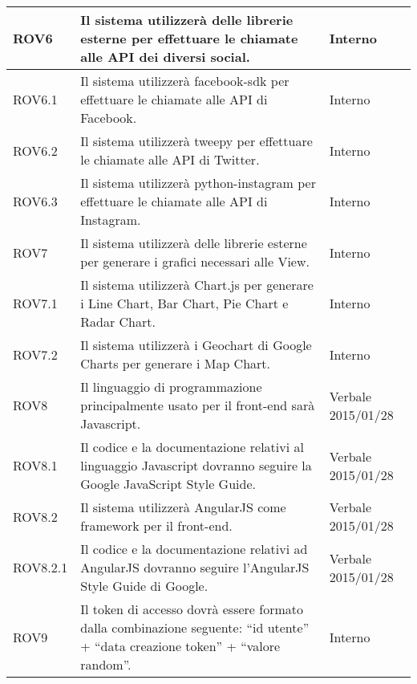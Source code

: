 \begin{center}
\begin{longtable}{| p{2.5cm} | p{8cm} | p{2cm} |}
		ROV6  &  Il sistema utilizzerà delle librerie esterne per effettuare le chiamate alle API dei diversi social.  &  Interno \\
		\hline
		ROV6.1  &  Il sistema utilizzerà facebook-sdk per effettuare le chiamate alle API di Facebook.  &  Interno \\
		\hline
		ROV6.2  &  Il sistema utilizzerà tweepy per effettuare le chiamate alle API di Twitter.  &  Interno \\
		\hline
		ROV6.3  &  Il sistema utilizzerà python-instagram per effettuare le chiamate alle API di Instagram.  &  Interno \\
		\hline

		ROV7  &  Il sistema utilizzerà delle librerie esterne per generare i grafici necessari alle View.  &  Interno \\
		\hline
		ROV7.1  &  Il sistema utilizzerà Chart.js per generare i Line Chart, Bar Chart, Pie Chart e Radar Chart.  &  Interno \\
		\hline
		ROV7.2  &  Il sistema utilizzerà i Geochart di Google Charts per generare i Map Chart.  &  Interno \\
		\hline

		ROV8  &  Il linguaggio di programmazione principalmente usato per il front-end sarà Javascript.  &  Verbale 2015/01/28 \\
		\hline
		ROV8.1 & Il codice e la documentazione relativi al linguaggio Javascript dovranno seguire la Google JavaScript Style Guide. & Verbale 2015/01/28 \\
		\hline
		ROV8.2  &  Il sistema utilizzerà AngularJS come framework per il front-end.  &  Verbale 2015/01/28 \\
		\hline
		ROV8.2.1 & Il codice e la documentazione relativi ad AngularJS dovranno seguire l'AngularJS Style Guide di Google. & Verbale 2015/01/28 \\

		ROV9  &  Il token di accesso dovrà essere formato dalla combinazione seguente: ``id utente'' + ``data creazione token'' + ``valore random''.  &  Interno \\
		\hline

	\end{longtable}
	\egroup
\end{center}
